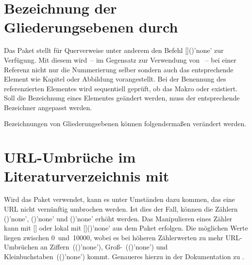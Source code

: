 \section{Bezeichnung der Gliederungsebenen durch }
%
%
Das Paket  stellt für Querverweise unter anderem den Befehl 
[]()'none' zur Verfügung. Mit 
diesem wird~-- im Gegensatz zur Verwendung von ~-- bei einer 
Referenz nicht nur die Nummerierung selber sondern auch das entsprechende 
Element wie Kapitel oder Abbildung vorangestellt. Bei der Benennung des 
referenzierten Elementes wird sequentiell geprüft, ob das Makro 
 oder 
 existiert. Soll die Bezeichnung eines 
Elementes geändert werden, muss der entsprechende Bezeichner angepasst werden.
%
\begin{Example}
Bezeichnungen von Gliederungsebenen können folgendermaßen verändert werden.
\begin{Code}
\end{Code}
\end{Example}



\section{URL-Umbrüche im Literaturverzeichnis mit }
%
%
Wird das Paket  verwendet, kann es unter Umständen dazu 
kommen, das eine URL nicht vernünftig umbrochen werden. Ist dies der Fall, 
können die Zählern ()'none', 
()'none' und 
()'none' erhöht werden. Das 
Manipulieren eines Zähler kann mit [] oder 
lokal mit []()'none' aus 
dem Paket  erfolgen. Die möglichen Werte liegen zwischen 
0~und~10000, wobei es bei höheren Zählerwerten zu mehr URL-Umbrüchen an 
Ziffern~(()'none'), 
Groß-~(()'none') und 
Kleinbuchstaben~(()'none') kommt. 
Genaueres hierzu in der Dokumentation zu .



